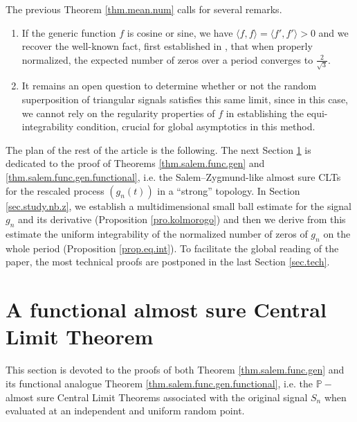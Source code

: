 \documentclass{svproc}
\begin{document}
\begin{remark} The previous Theorem \ref{thm.mean.num} calls for several remarks.
\begin{enumerate}
\item If the generic function $f$ is cosine or sine, we have $\langle f, f\rangle = \langle f',f'\rangle>0$ and we recover the well-known fact, first established in \cite{Dun66}, that when properly normalized, the expected number of zeros over a period converges to  $\frac{2}{\sqrt{3}}$. 
\item It remains an open question to determine whether or not the random superposition of triangular signals satisfies this same limit, since in this case, we cannot rely on the regularity properties of $f$ in establishing the equi-integrability condition, crucial for global asymptotics in this method.
\end{enumerate}
\end{remark}



The plan of the rest of the article is the following. The next Section \ref{sec.uni.SZ} is dedicated to the proof of Theorems \ref{thm.salem.func.gen} and \ref{thm.salem.func.gen.functional}, i.e. the Salem--Zygmund-like almost sure CLTs for the rescaled process $(g_n(t))$ in a ``strong'' topology. In Section \ref{sec.study.nb.z}, we establish a multidimensional small ball estimate for the signal $g_n$ and its derivative (Proposition \ref{pro.kolmorogo}) and then we derive from this estimate the uniform integrability of the normalized number of zeros of $g_n$ on the whole period (Proposition \ref{prop.eq.int}). To facilitate the global reading of the paper, the most technical proofs are postponed in the last Section \ref{sec.tech}.


\section{A functional almost sure Central Limit Theorem} \label{sec.uni.SZ} 
This section is devoted to {the proofs} of both Theorem \ref{thm.salem.func.gen} and its functional analogue Theorem \ref{thm.salem.func.gen.functional}, i.e. the $\mathbb P-$almost sure Central Limit Theorems associated with the original signal $S_n$ when evaluated at an independent and uniform random point.
\end{document}
